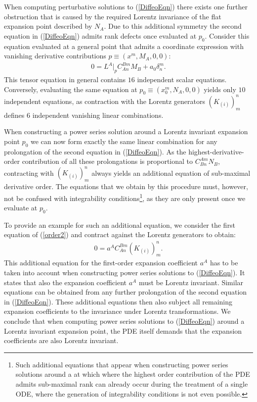 \documentclass[%
preprint,
nofootinbib,
amsmath,amssymb,
aps,
prd,
floatfix,
]{revtex4-2}
\begin{document}
When computing perturbative solutions to (\ref{DiffeoEqn})  there exists one further obstruction that is caused by the required Lorentz invariance of the flat expansion point described by $N_A$. Due to this additional symmetry the second equation in (\ref{DiffeoEqn}) admits rank defects once evaluated at $p_0$. Consider this equation evaluated at a general point that admits a coordinate expression with vanishing derivative contributions $p \equiv (x^m,M_A,0,0)$:
\begin{align}
0 = L^A \big \vert_{p} C_{An}^{Bm}M_B + a_0 \delta^m_n.
\end{align}
This tensor equation in general contains $16$ independent scalar equations. Conversely, evaluating the same equation at $p_0\equiv (x_0^m, N_A,0,0)$ yields only $10$ independent equations, as contraction with the Lorentz generators $(K_{(i)})^n_m$ defines $6$ independent vanishing linear combinations.

When constructing a power series solution around a Lorentz invariant expansion point $p_0$ we can now form exactly the same linear combination for any prolongation of the second equation in (\ref{DiffeoEqn}). As the highest-derivative-order contribution of all these prolongations is proportional to $C^{Am}_{Bn}N_B$, contracting with $(K_{(i)})^n_m$ always yields an additional equation of sub-maximal derivative order. The equations that we obtain by this procedure must, however, not be confused with integrability conditions\footnote{Such additional equations that appear when constructing power series solutions around a at which where the highest order contribution of the PDE admits sub-maximal rank can already occur during the treatment of a single ODE, where the generation of integrability conditions is not even possible.}, as they are only present once we evaluate at $p_0$. 

To provide an example for such an additional equation, we consider the first equation of (\ref{order2}) and contract against the Lorentz generators to obtain:
\begin{align}\label{ansatz1}
    0 = a^A C^{Bm}_{An}  (K_{(i)})^n_m.
\end{align}
This additional equation for the first-order expansion coefficient $a^A$ has to be taken into account when constructing power series solutions to (\ref{DiffeoEqn}).
It states that also the expansion coefficient $a^A$ must be Lorentz invariant. 
Similar equations can be obtained from any further prolongation of the second equation in (\ref{DiffeoEqn}). These additional equations then also subject all remaining expansion coefficients to the invariance under Lorentz transformations.
We conclude that when computing power series solutions to (\ref{DiffeoEqn}) around a Lorentz invariant expansion point, the PDE itself demands that the expansion coefficients are also Lorentz invariant.
\end{document}
